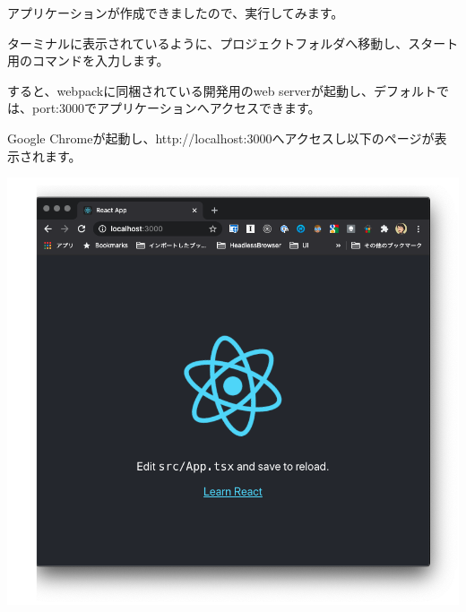 アプリケーションが作成できましたので、実行してみます。

ターミナルに表示されているように、プロジェクトフォルダへ移動し、スタート用のコマンドを入力します。

\def\startercodeblockfontsize{}
\begin{starterterminal}[]{}\end{starterterminal}

すると、webpackに同梱されている開発用のweb serverが起動し、デフォルトでは、port:3000でアプリケーションへアクセスできます。

\def\startercodeblockfontsize{}
\begin{starterterminal}[]{}\end{starterterminal}

Google Chromeが起動し、http://localhost:3000へアクセスし以下のページが表示されます。

\begin{reviewimage}[H]%
\includegraphics[width=1.0\maxwidth]{./images/02-create-react-app/02_cra_start.png}%
\label{image:02-create-react-app:02_cra_start}
\end{reviewimage}

